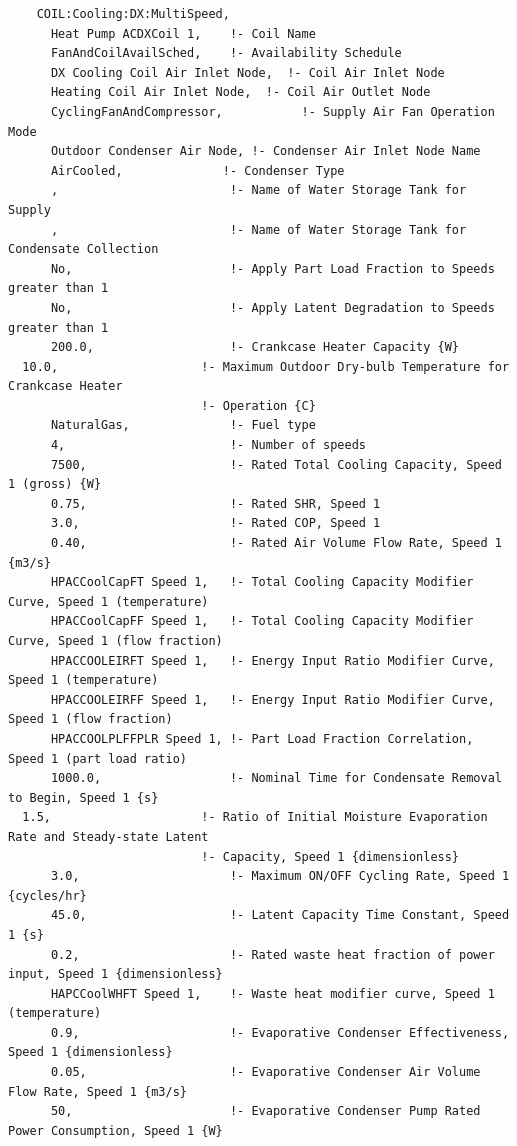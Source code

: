 \begin{lstlisting}
    COIL:Cooling:DX:MultiSpeed,
      Heat Pump ACDXCoil 1,    !- Coil Name
      FanAndCoilAvailSched,    !- Availability Schedule
      DX Cooling Coil Air Inlet Node,  !- Coil Air Inlet Node
      Heating Coil Air Inlet Node,  !- Coil Air Outlet Node
      CyclingFanAndCompressor,           !- Supply Air Fan Operation Mode
      Outdoor Condenser Air Node, !- Condenser Air Inlet Node Name
      AirCooled,              !- Condenser Type
      ,                        !- Name of Water Storage Tank for Supply
      ,                        !- Name of Water Storage Tank for Condensate Collection
      No,                      !- Apply Part Load Fraction to Speeds greater than 1
      No,                      !- Apply Latent Degradation to Speeds greater than 1
      200.0,                   !- Crankcase Heater Capacity {W}
  10.0,                    !- Maximum Outdoor Dry-bulb Temperature for Crankcase Heater
                           !- Operation {C}
      NaturalGas,              !- Fuel type
      4,                       !- Number of speeds
      7500,                    !- Rated Total Cooling Capacity, Speed 1 (gross) {W}
      0.75,                    !- Rated SHR, Speed 1
      3.0,                     !- Rated COP, Speed 1
      0.40,                    !- Rated Air Volume Flow Rate, Speed 1 {m3/s}
      HPACCoolCapFT Speed 1,   !- Total Cooling Capacity Modifier Curve, Speed 1 (temperature)
      HPACCoolCapFF Speed 1,   !- Total Cooling Capacity Modifier Curve, Speed 1 (flow fraction)
      HPACCOOLEIRFT Speed 1,   !- Energy Input Ratio Modifier Curve, Speed 1 (temperature)
      HPACCOOLEIRFF Speed 1,   !- Energy Input Ratio Modifier Curve, Speed 1 (flow fraction)
      HPACCOOLPLFFPLR Speed 1, !- Part Load Fraction Correlation, Speed 1 (part load ratio)
      1000.0,                  !- Nominal Time for Condensate Removal to Begin, Speed 1 {s}
  1.5,                     !- Ratio of Initial Moisture Evaporation Rate and Steady-state Latent
                           !- Capacity, Speed 1 {dimensionless}
      3.0,                     !- Maximum ON/OFF Cycling Rate, Speed 1 {cycles/hr}
      45.0,                    !- Latent Capacity Time Constant, Speed 1 {s}
      0.2,                     !- Rated waste heat fraction of power input, Speed 1 {dimensionless}
      HAPCCoolWHFT Speed 1,    !- Waste heat modifier curve, Speed 1 (temperature)
      0.9,                     !- Evaporative Condenser Effectiveness, Speed 1 {dimensionless}
      0.05,                    !- Evaporative Condenser Air Volume Flow Rate, Speed 1 {m3/s}
      50,                      !- Evaporative Condenser Pump Rated Power Consumption, Speed 1 {W}

\end{lstlisting}
